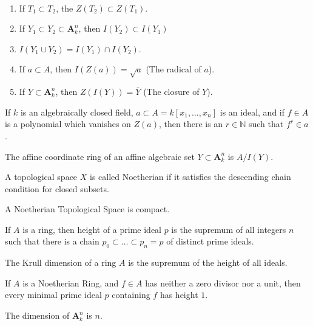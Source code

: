 \documentclass[crop=false,class=book]{standalone}
\begin{document}
\begin{theorem}
\
\begin{enumerate}
    \item If $T_1\subset T_2$, the  $Z(T_2)\subset Z(T_1)$.
    \item If $Y_1\subset Y_2 \subset \textbf{A}_k^n$, then $I(Y_2)\subset I(Y_1)$
    \item $I(Y_1\cup Y_2) = I(Y_1)\cap I(Y_2)$.
    \item If $a\subset A$, then $I(Z(a)) = \sqrt{a}$ (The radical of $a$).
    \item If $Y\subset \textbf{A}_k^n$, then $Z(I(Y)) = \overline{Y}$ (The closure of $Y$).
\end{enumerate}
\end{theorem}
\begin{theorem}
If $k$ is an algebraically closed field, $a\subset A=k[x_1,\hdots ,x_n]$ is an ideal, and if $f\in A$ is a polynomial which vanishes on $Z(a)$, then there is an $r\in \mathbb{N}$ such that $f^{r}\in a$.
\end{theorem}
\begin{definition}
The affine coordinate ring of an affine algebraic set $Y\subset \textbf{A}_k^n$ is $A/I(Y)$.
\end{definition}
\begin{definition}
A topological space $X$ is called Noetherian if it satisfies the descending chain condition for closed subsets.
\end{definition}
\begin{theorem}
A Noetherian Topological Space is compact.
\end{theorem}
\begin{definition}
If $A$ is a ring, then height of a prime ideal $p$ is the supremum of all integers $n$ such that there is a chain $p_0\subset \hdots \subset p_n = p$ of distinct prime ideals.
\end{definition}
\begin{definition}
The Krull dimension of a ring $A$ is the supremum of the height of all ideals.
\end{definition}
\begin{theorem}
If $A$ is a Noetherian Ring, and $f\in A$ has neither a zero divisor nor a unit, then every minimal prime ideal $p$ containing $f$ has height $1$.
\end{theorem}
\begin{theorem}
The dimension of $\textbf{A}_k^n$ is $n$.
\end{theorem}
\end{document}
